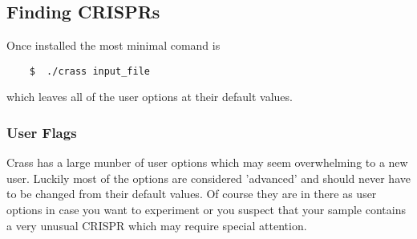 \documentclass[11pt]{article} %
\begin{document}
\subsection{Finding CRISPRs}
Once installed the most minimal comand is 
\begin{lstlisting}
	$  ./crass input_file
\end{lstlisting}
which leaves all of the user options at their default values.

\subsubsection{User Flags}
\label{sec:userflags}
Crass has a large munber of user options which may seem overwhelming to a new user.  Luckily most of the options are considered 'advanced' and should never have to be changed from their default values.  Of course they are in there as user options in case you want to experiment or you suspect that your sample contains a very unusual CRISPR which may require special attention. 
\end{document}

